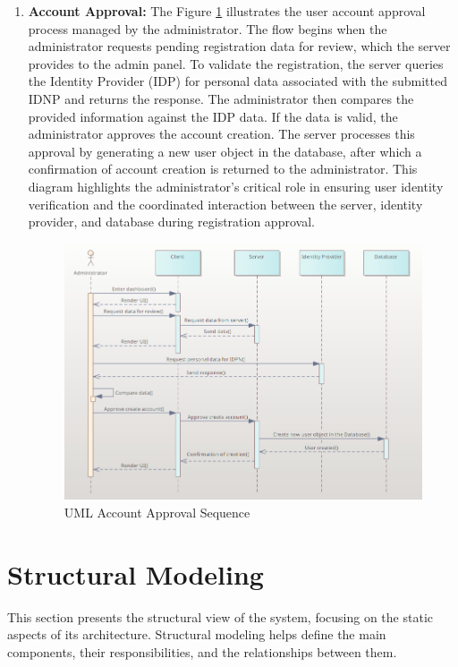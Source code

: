 \begin{enumerate}
    \item \textbf{Account Approval:} The Figure \ref{uml-sequence-approve} illustrates the user account approval process managed by the administrator. The flow begins when the administrator requests pending registration data for review, which the server provides to the admin panel. To validate the registration, the server queries the Identity Provider (IDP) for personal data associated with the submitted IDNP and returns the response. The administrator then compares the provided information against the IDP data. If the data is valid, the administrator approves the account creation. The server processes this approval by generating a new user object in the database, after which a confirmation of account creation is returned to the administrator. This diagram highlights the administrator’s critical role in ensuring user identity verification and the coordinated interaction between the server, identity provider, and database during registration approval.
    \begin{figure}[H]
        \centering
        \includegraphics[width=18cm]{"images/umlDiagrams/uml-sequence-approve.png"}
        \caption{UML Account Approval Sequence}
        \label{uml-sequence-approve}
    \end{figure}
\end{enumerate}


\section{Structural Modeling}
This section presents the structural view of the system, focusing on the static aspects of its architecture. Structural modeling helps define the main components, their responsibilities, and the relationships between them.

